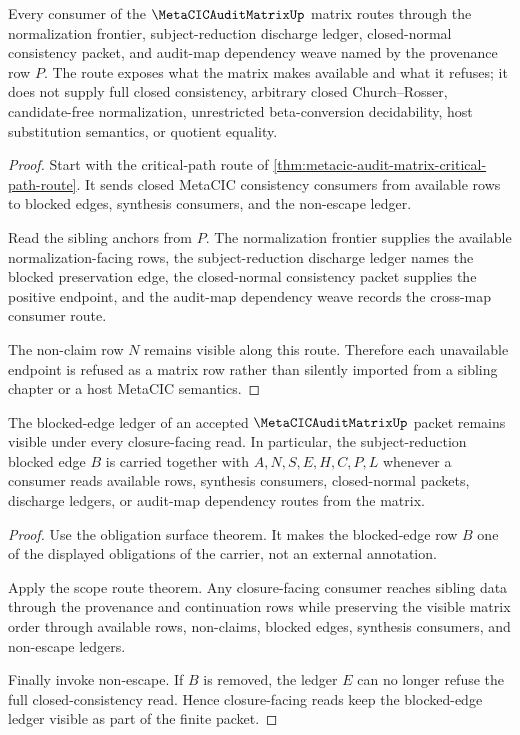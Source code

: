 \begin{theorem}
\label{thm:metacic-audit-matrix-scope-route}
Every consumer of the $\MetaCICAuditMatrixUp$ matrix routes through the normalization frontier, subject-reduction discharge ledger, closed-normal consistency packet, and audit-map dependency weave named by the provenance row $P$. The route exposes what the matrix makes available and what it refuses; it does not supply full closed consistency, arbitrary closed Church--Rosser, candidate-free normalization, unrestricted beta-conversion decidability, host substitution semantics, or quotient equality.
\end{theorem}
\begin{proof}
Start with the critical-path route of \autoref{thm:metacic-audit-matrix-critical-path-route}. It sends closed MetaCIC consistency consumers from available rows to blocked edges, synthesis consumers, and the non-escape ledger.

Read the sibling anchors from $P$. The normalization frontier supplies the available normalization-facing rows, the subject-reduction discharge ledger names the blocked preservation edge, the closed-normal consistency packet supplies the positive endpoint, and the audit-map dependency weave records the cross-map consumer route.

The non-claim row $N$ remains visible along this route. Therefore each unavailable endpoint is refused as a matrix row rather than silently imported from a sibling chapter or a host MetaCIC semantics.
\end{proof}

\begin{theorem}
\label{thm:metacic-audit-matrix-closure-ledger}
The blocked-edge ledger of an accepted $\MetaCICAuditMatrixUp$ packet remains visible under every closure-facing read. In particular, the subject-reduction blocked edge $B$ is carried together with $A,N,S,E,H,C,P,L$ whenever a consumer reads available rows, synthesis consumers, closed-normal packets, discharge ledgers, or audit-map dependency routes from the matrix.
\end{theorem}
\begin{proof}
Use the obligation surface theorem. It makes the blocked-edge row $B$ one of the displayed obligations of the carrier, not an external annotation.

Apply the scope route theorem. Any closure-facing consumer reaches sibling data through the provenance and continuation rows while preserving the visible matrix order through available rows, non-claims, blocked edges, synthesis consumers, and non-escape ledgers.

Finally invoke non-escape. If $B$ is removed, the ledger $E$ can no longer refuse the full closed-consistency read. Hence closure-facing reads keep the blocked-edge ledger visible as part of the finite packet.
\end{proof}

